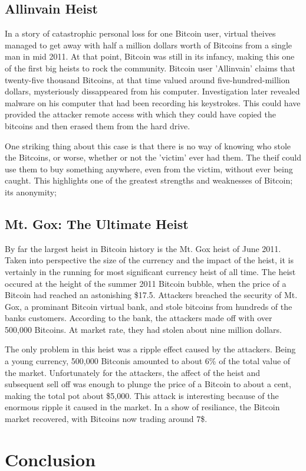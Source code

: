 \documentclass{report}
\begin{document}
\subsection*{Allinvain Heist}
In a story of catastrophic personal loss for one Bitcoin user, virtual theives managed 
to get away with half a million dollars worth of Bitcoins from a single man in mid 2011\cite{Worstoll:Allinvain}.
At that point, Bitcoin was still in its infancy, making this one of the first big heists 
to rock the community.  Bitcoin user 'Allinvain' claims that twenty-five thousand Bitcoins,
at that time valued around five-hundred-million dollars, mysteriously dissappeared from 
his computer.  Investigation later revealed malware on his computer that had been recording
his keystrokes.  This could have provided the attacker remote access with which they could
have copied the bitcoins and then erased them from the hard drive.

One striking thing about this case is that there is no way of knowing who stole the Bitcoins, 
or worse, whether or not the 'victim' ever had them.  The theif could use them to buy 
something anywhere, even from the victim, without ever being caught.  This highlights one 
of the greatest strengths and weaknesses of Bitcoin; its anonymity;

\subsection*{Mt. Gox: The Ultimate Heist}
By far the largest heist in Bitcoin history is the Mt. Gox heist of June 2011\cite{Rashid:MtGox}.  Taken into
perspective the size of the currency and the impact of the heist, it is vertainly in the
running for most significant currency heist of all time.  The heist occured at the height
of the summer 2011 Bitcoin bubble, when the price of a Bitcoin had reached an astonishing
\$17.5.  Attackers breached the security of Mt. Gox, a prominant Bitcoin virtual bank,
and stole bitcoins from hundreds of the banks customers.  According to the bank, the attackers
made off with over 500,000 Bitcoins.  At market rate, they had stolen about nine million
dollars.

The only problem in this heist was a ripple effect caused by the attackers.  Being a young
currency, 500,000 Bitconis amounted to about 6\% of the total value of the market.
Unfortunately for the attackers, the affect of the heist and subsequent sell off was enough
to plunge the price of a Bitcoin to about a cent, making the total pot about \$5,000.  This
attack is interesting because of the enormous ripple it caused in the market.  In a show of
resiliance, the Bitcoin market recovered, with Bitcoins now trading around 7\$.

\section*{Conclusion}

{}

\end{document}
